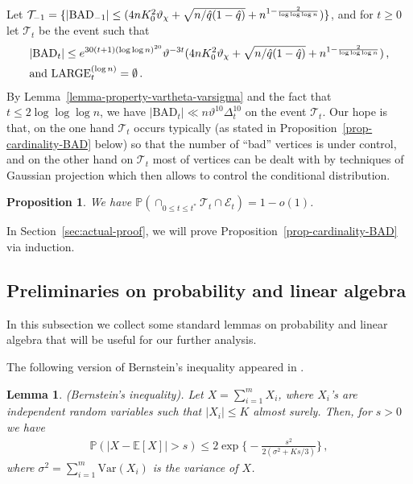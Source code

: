 \documentclass[11pt]{article}
\newtheorem{Lemma}[Theorem]{Lemma}
\newtheorem{Proposition}[Theorem]{Proposition}
\numberwithin{equation}{section}
\begin{document}
Let $\mathcal{T}_{-1}= \{ |\mathrm{BAD}_{-1}| \leq  ( 4 n K_0^2 \vartheta_{\chi} + \sqrt{n/\Hat{q}(1-\Hat{q})} + n^{1-\frac{2}{\log \log \log n}} ) \} $, and for $t \geq 0$ let $\mathcal{T}_t$ be the event such that
\begin{equation}\label{eq-def-mathcal-T-t}
\begin{aligned}
    & |\mathrm{BAD}_t| \leq e^{ 30(t+1)(\log \log n)^{20}} \vartheta^{-3t} ( 4 n K_0^2 \vartheta_{\chi} + \sqrt{n/\Hat{q}(1-\Hat{q})} + n^{1-\frac{2}{\log \log \log n}} ) \,, \\
    & \mbox{and } \mathrm{LARGE}_t^{(\log n)} = \emptyset \,.
\end{aligned}
\end{equation}
By Lemma~\ref{lemma-property-vartheta-varsigma} and the fact that $t \leq 2 \log \log \log n$, we have  $|\mathrm{BAD}_t| \ll n \vartheta^{10} \Delta_t^{10}$ on the event $\mathcal T_t$. Our hope is that, on the one hand $\mathcal T_t$ occurs typically (as stated in Proposition~\ref{prop-cardinality-BAD} below) so that the number of ``bad'' vertices is under control, and on the other hand on $\mathcal T_t$ most of vertices can be dealt with by techniques of Gaussian projection which then allows to control the conditional distribution.
\begin{Proposition} {\label{prop-cardinality-BAD}}
    We have $\mathbb P(\cap_{0 \leq t \leq t^*} \mathcal{T}_t \cap \mathcal E_t) = 1-o(1)$.
\end{Proposition}
In Section~\ref{sec:actual-proof}, we will prove Proposition~\ref{prop-cardinality-BAD} via induction.





\subsection{Preliminaries on probability and linear algebra}
In this subsection we collect some  standard lemmas on probability and linear algebra that will be useful for our further analysis.

The following version of Bernstein's inequality appeared in \cite[Theorem 1.4]{DP09}.
\begin{Lemma} {\label{lemma-Bernstein-inequality}}
\textup{(Bernstein's inequality)}.
Let $X=\sum_{i=1}^{m} X_i$, where $X_i$'s are independent random variables such that $|X_i| \leq K$ almost surely. Then, for $s>0$ we have
\begin{align*}
    \mathbb{P}( |X-\mathbb{E}[X]| > s ) \leq 2 \exp \Big\{ - \frac{ s^2 }{ 2(\sigma^2 + Ks/3) } \Big\} \,,
\end{align*}
where $\sigma^2 = \sum_{i=1}^{m} \mathrm{Var}(X_i)$ is the variance of $X$.
\end{Lemma}
\end{document}
